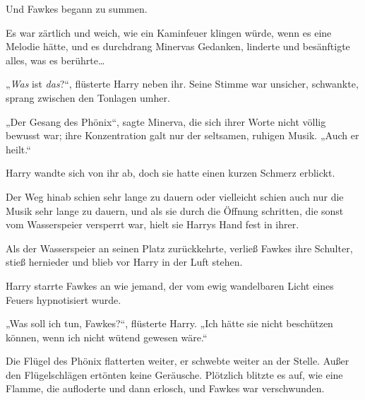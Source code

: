 Und Fawkes begann zu summen.

Es war zärtlich und weich, wie ein Kaminfeuer klingen würde, wenn es eine Melodie hätte, und es durchdrang Minervas Gedanken, linderte und besänftigte alles, was es berührte…

„\emph{Was} ist \emph{das}?“, flüsterte Harry neben ihr. Seine Stimme war unsicher, schwankte, sprang zwischen den Tonlagen umher.

„Der Gesang des Phönix“, sagte Minerva, die sich ihrer Worte nicht völlig bewusst war; ihre Konzentration galt nur der seltsamen, ruhigen Musik. „Auch er heilt.“

Harry wandte sich von ihr ab, doch sie hatte einen kurzen Schmerz erblickt.

Der Weg hinab schien sehr lange zu dauern oder vielleicht schien auch nur die Musik sehr lange zu dauern, und als sie durch die Öffnung schritten, die sonst vom Wasserspeier versperrt war, hielt sie Harrys Hand fest in ihrer.

Als der Wasserspeier an seinen Platz zurückkehrte, verließ Fawkes ihre Schulter, stieß hernieder und blieb vor Harry in der Luft stehen.

Harry starrte Fawkes an wie jemand, der vom ewig wandelbaren Licht eines Feuers hypnotisiert wurde.

„Was soll ich tun, Fawkes?“, flüsterte Harry. „Ich hätte sie nicht beschützen können, wenn ich nicht wütend gewesen wäre.“

Die Flügel des Phönix flatterten weiter, er schwebte weiter an der Stelle. Außer den Flügelschlägen ertönten keine Geräusche. Plötzlich blitzte es auf, wie eine Flamme, die aufloderte und dann erlosch, und Fawkes war verschwunden.

